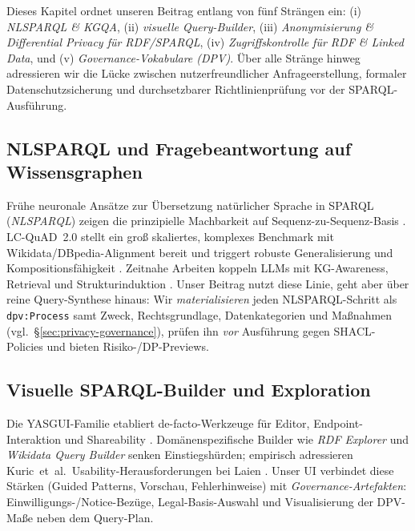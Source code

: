 Dieses Kapitel ordnet unseren Beitrag entlang von fünf Strängen ein: (i) \emph{NL{\textrightarrow}SPARQL \& KGQA}, (ii) \emph{visuelle Query-Builder}, (iii) \emph{Anonymisierung \& Differential Privacy für RDF/SPARQL}, (iv) \emph{Zugriffskontrolle für RDF \& Linked Data}, und (v) \emph{Governance-Vokabulare (DPV)}. Über alle Stränge hinweg adressieren wir die Lücke zwischen nutzerfreundlicher Anfrageerstellung, formaler Datenschutzsicherung und durchsetzbarer Richtlinienprüfung vor der SPARQL-Ausführung.

\subsection{NL{\textrightarrow}SPARQL und Fragebeantwortung auf Wissensgraphen}
Frühe neuronale Ansätze zur Übersetzung natürlicher Sprache in SPARQL (\emph{NL{\textrightarrow}SPARQL}) zeigen die prinzipielle Machbarkeit auf Sequenz-zu-Sequenz-Basis \cite{yin-nmt-sparql}. LC-QuAD~2.0 stellt ein groß skaliertes, komplexes Benchmark mit Wikidata/DBpedia-Alignment bereit und triggert robuste Generalisierung und Kompositionsfähigkeit \cite{lcquad2}. Zeitnahe Arbeiten koppeln LLMs mit KG-Awareness, Retrieval und Strukturinduktion \cite{avila-kgqa-llm,pramanik-uniqorn}. 
Unser Beitrag nutzt diese Linie, geht aber über reine Query-Synthese hinaus: Wir \emph{materialisieren} jeden NL{\textrightarrow}SPARQL-Schritt als \texttt{dpv:Process} samt Zweck, Rechtsgrundlage, Datenkategorien und Maßnahmen (vgl.\ \S\ref{sec:privacy-governance}), prüfen ihn \emph{vor} Ausführung gegen SHACL-Policies und bieten Risiko-/DP-Previews.

\subsection{Visuelle SPARQL-Builder und Exploration}
Die YASGUI-Familie etabliert de-facto-Werkzeuge für Editor, Endpoint-Interaktion und Shareability \cite{yasgui}. Domänenspezifische Builder wie \emph{RDF Explorer} \cite{vargas-rdf-explorer} und \emph{Wikidata Query Builder} senken Einstiegshürden; empirisch adressieren Kuric~et~al.\ Usability-Herausforderungen bei Laien \cite{kuric-usability}. Unser UI verbindet diese Stärken (Guided Patterns, Vorschau, Fehlerhinweise) mit \emph{Governance-Artefakten}: Einwilligungs-/Notice-Bezüge, Legal-Basis-Auswahl und Visualisierung der DPV-Maße neben dem Query-Plan.

